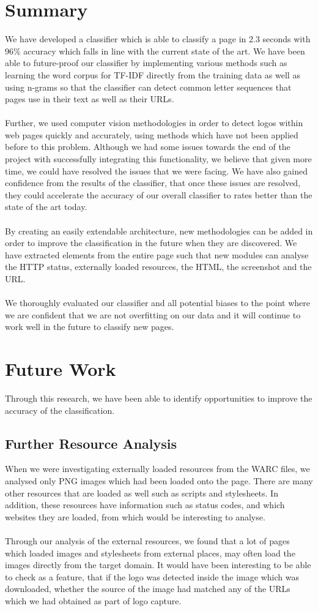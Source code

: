 \documentclass[12pt,twoside]{report}
\begin{document}
\section{Summary}
We have developed a classifier which is able to classify a page in 2.3 seconds with 96\% accuracy which falls in line with the current state of the art. We have been able to future-proof our classifier by implementing various methods such as learning the word corpus for TF-IDF directly from the training data as well as using n-grams so that the classifier can detect common letter sequences that pages use in their text as well as their URLs.  
\\\\
Further, we used computer vision methodologies in order to detect logos within web pages quickly and accurately, using methods which have not been applied before to this problem. Although we had some issues towards the end of the project with successfully integrating this functionality, we believe that given more time, we could have resolved the issues that we were facing. We have also gained confidence from the results of the classifier, that once these issues are resolved, they could accelerate the accuracy of our overall classifier to rates better than the state of the art today.
\\\\
By creating an easily extendable architecture, new methodologies can be added in order to improve the classification in the future when they are discovered. We have extracted elements from the entire page such that new modules can analyse the HTTP status, externally loaded resources, the HTML, the screenshot and the URL.
\\\\
We thoroughly evaluated our classifier and all potential biases to the point where we are confident that we are not overfitting on our data and it will continue to work well in the future to classify new pages.
\section{Future Work}
Through this research, we have been able to identify opportunities to improve the accuracy of the classification.
\subsection{Further Resource Analysis}
When we were investigating externally loaded resources from the WARC files, we analysed only PNG images which had been loaded onto the page. There are many other resources that are loaded as well such as scripts and stylesheets. In addition, these resources have information such as status codes, and which websites they are loaded, from which would be interesting to analyse.
\\\\
Through our analysis of the external resources, we found that a lot of pages which loaded images and stylesheets from external places, may often load the images directly from the target domain. It would have been interesting to be able to check as a feature, that if the logo was detected inside the image which was downloaded, whether the source of the image had matched any of the URLs which we had obtained as part of logo capture.
\end{document}
